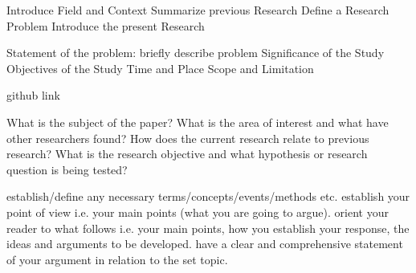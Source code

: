 Introduce Field and Context
Summarize previous Research
Define a Research Problem
Introduce the present Research

Statement of the problem: briefly describe problem
Significance of the Study
Objectives of the Study
Time and Place
Scope and Limitation

github link

What is the subject of the paper?
What is the area of interest and what have other researchers found?
How does the current research relate to previous research?
What is the research objective and what hypothesis or research question is being tested?

establish/define any necessary terms/concepts/events/methods etc.
establish your point of view i.e. your main points (what you are going to argue).
orient your reader to what follows i.e. your main points, how you establish your response, the ideas and arguments to be developed.
have a clear and comprehensive statement of your argument in relation to the set topic.

\newpage
